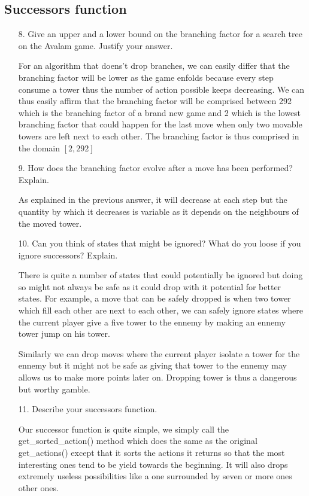 \subsection{Successors function}

\begin{enumerate}
    \item[8.] Give an upper and a lower bound on the branching factor for a search tree on the Avalam game. Justify your answer.
    \begin{framed}
        For an algorithm that doens't drop branches, we can easily differ that the branching factor will be lower as the game enfolds because every step consume a tower thus the number of action possible keeps decreasing. We can thus easily affirm that the branching factor will be comprised between 292 which is the branching factor of a brand new game and 2 which is the lowest branching factor that could happen for the last move when only two movable towers are left next to each other. The branching factor is thus comprised in the domain $[2, 292]$
    \end{framed}
    \item[9.] How does the branching factor evolve after a move has been performed? Explain.
    \begin{framed}
        As explained in the previous answer, it will decrease at each step but the quantity by which it decreases is variable as it depends on the neighbours of the moved tower.
    \end{framed}
    \item[10.] Can you think of states that might be ignored? What do you loose if you ignore successors? Explain.
    \begin{framed}
        There is quite a number of states that could potentially be ignored but doing so might not always be safe as it could drop with it potential for better states. For example, a move that can be safely dropped is when two tower which fill each other are next to each other, we can safely ignore states where the current player give a five tower to the ennemy by making an ennemy tower jump on his tower. \newline

        Similarly we can drop moves where the current player isolate a tower for the ennemy but it might not be safe as giving that tower to the ennemy may allows us to make more points later on. Dropping tower is thus a dangerous but worthy gamble.
    \end{framed}
    \item[11.] Describe your successors function.
    \begin{framed}
        Our successor function is quite simple, we simply call the get\_sorted\_action() method which does the same as the original get\_actions() except that it sorts the actions it returns so that the most interesting ones tend to be yield towards the beginning. It will also drops extremely useless possibilities like a one surrounded by seven or more ones other ones.


\end{framed}
\end{enumerate}
